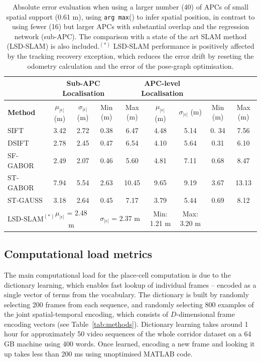\begin{table}[h]
\centering
\begin{adjustbox}{max width=\textwidth}

    \begin{tabular}{lcccccccc}
    ~		 & \multicolumn{3}{c}{\textbf{Sub-APC Localisation}} & \multicolumn{3}{c}{\textbf{APC-level Localisation}} \\ \hline
    \textbf{Method}        & $\mu_{|\epsilon|}$ (m) & $\sigma_{|\epsilon|}$ (m) & Min (m) & Max (m) & $\mu_{|\epsilon|}$ (m) & $\sigma_{|\epsilon|}$ (m)  &   Min (m) & Max (m) \\ \hline
    SIFT     & 3.42 & 2.72 & 0.38 & 6.47 & 4.48  & 5.14  & 0. 34 &  7.56\\ \hline
    DSIFT    & 2.78 & 2.45 & 0.47 & 6.54  & 4.10 & 5.64 & 0.31 & 6.10 \\ \hline
    SF-GABOR & 2.49 & 2.07 & 0.46 & 5.60 & 4.81  & 7.11 & 0.68  & 8.47 \\ \hline
    ST-GABOR & 7.94 & 5.54 & 2.63 & 10.45 & 9.65 & 9.19 & 3.67 & 13.13\\ \hline
    ST-GAUSS & 3.18 & 2.64 & 0.45 & 7.17 & 3.79  & 5.44 & 0.69  & 8.12 \\ \hline
    $\text{LSD-SLAM}^{(*)}$ & \multicolumn{2}{c}{$\mu_{|\epsilon|}$ = 2.48 m } & \multicolumn{2}{c}{$\sigma_{|\epsilon|}$ = 2.37 m} & Min: 1.21 m &  Max: 3.20 m \\ \hline
    \end{tabular}
\end{adjustbox}
    \caption {Absolute error evaluation when using a larger number (40) of APCs of small spatial support (0.61 m), using \texttt{arg max}() to infer spatial position, in contrast to using fewer (16) but larger APCs with substantial overlap and the regression network (sub-APC). The comparison with a state of the art SLAM method (LSD-SLAM) is also included.$^{(*)}$ LSD-SLAM performance is positively affected by the tracking recovery exception, which reduces the error drift by reseting the odometry calculation and the error of the pose-graph optimisation.}
    \label{table:methodComparison}
\end{table}


\subsection{Computational load metrics}
The main computational load for the place-cell computation is due to the dictionary learning, which enables fast lookup of individual frames -- encoded as a single vector of terms from the vocabulary.  The dictionary is built by randomly selecting 200 frames from each sequence, and randomly selecting 800 examples of the joint spatial-temporal encoding, which consists of $D$-dimensional frame encoding vectors (see Table~\ref{tab:methods}). Dictionary learning takes around 1 hour for approximately 50 video sequences of the whole corridor dataset on a 64 GB machine using 400 words. Once learned, encoding a new frame and looking it up takes less than 200 ms using unoptimised MATLAB code. 

